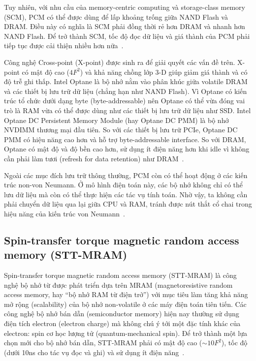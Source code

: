 Tuy nhiên, với nhu cầu của memory-centric computing và storage-class memory
(SCM), PCM có thể được dùng để lấp khoảng trống giữa NAND Flash và DRAM. Điều
này có nghĩa là SCM phải đồng thời rẻ hơn DRAM và nhanh hơn NAND Flash. Để trở
thành SCM, tốc độ đọc dữ liệu và giá thành của PCM phải tiếp tục được cải thiện
nhiều hơn nữa~\cite{kimEvolutionPhaseChangeMemory2020}.

Công nghệ Cross-point (X-point) được sinh ra để giải quyết các vấn đề trên.
X-point có mật độ cao ($4F^2$) và khả năng chồng lớp 3-D giúp giảm giá thành và
có độ trễ ghi thấp. Intel Optane là bộ nhớ nằm vào phân khúc giữa volatile DRAM
và các thiết bị lưu trữ dữ liệu (chẳng hạn như NAND Flash). Vì Optane có kiến
trúc tổ chức dưới dạng byte (byte-addressable) nên Optane có thể vừa đóng vai
trò là RAM vừa có thể được dùng như các thiết bị lưu trữ dữ liệu như SSD. Intel
Optane DC Persistent Memory Module (hay Optane DC PMM) là bộ nhớ NVDIMM thương
mại đầu tiên. So với các thiết bị lưu trữ PCIe, Optane DC PMM có hiệu năng cao
hơn và hỗ trợ byte-addressable interface. So với DRAM, Optane có mật độ và độ
bền cao hơn, sử dụng ít điện năng hơn khi idle vì không cần phải làm tươi
(refresh for data retention) như
DRAM~\cite{izraelevitzBasicPerformanceMeasurements2019}.

Ngoài các mục đích lưu trữ thông thường, PCM còn có thể hoạt động ở các kiến
trúc non-von Neumann. Ở mô hình điện toán này, các bộ nhớ không chỉ có thể lưu
dữ liệu mà còn có thể thực hiện các tác vụ tính toán. Nhờ vậy, ta không cần
phải chuyển dữ liệu qua lại giữa CPU và RAM, tránh được nút thắt cổ chai trong
hiệu năng của kiến trúc von Neumann~\cite{galloOverviewPhasechangeMemory2020}.

\subsection{Spin-transfer torque magnetic random access memory (STT-MRAM)}
Spin-transfer torque magnetic random access memory (STT-MRAM) là công nghệ bộ
nhớ từ được phát triển dựa trên MRAM (magnetoresistive random access memory,
hay ``bộ nhớ RAM từ điện trở'') với mục tiêu làm tăng khả năng mở rộng
(scalability) của bộ nhớ non-volatile ở các máy điện toán tiên tiến. Các công
nghệ bộ nhớ bán dẫn (semiconductor memory) hiện nay thường sử dụng điện tích
electron (electron charge) mà không chú ý tới một đặc tính khác của electron:
spin cơ học lượng tử (quantum-mechanical spin). Để trở thành một lựa chọn mới
cho bộ nhớ bán dẫn, STT-MRAM phải có mật độ cao ($\sim10F^2$), tốc độ (dưới
10ns cho tác vụ đọc và ghi) và sử dụng ít điện
năng~\cite{apalkovSpintransferTorqueMagnetic2013}.


